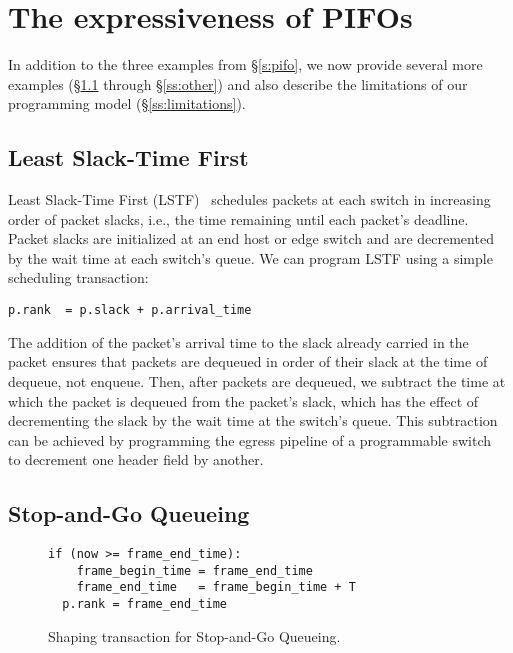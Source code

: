 \section{The expressiveness of PIFOs}
\label{s:expressive}

In addition to the three examples from \S\ref{s:pifo}, we now provide
several more examples (\S\ref{ss:lstf} through \S\ref{ss:other}) and
also describe the limitations of our programming model
(\S\ref{ss:limitations}).

%

\subsection{Least Slack-Time First}
\label{ss:lstf}

Least Slack-Time First (LSTF)~\cite{lstf,ups} schedules packets at
  each switch in increasing order of packet slacks, i.e., the time
  remaining until each packet's deadline.  Packet slacks are
  initialized at an end host or edge switch and are decremented by the
  wait time at each switch's queue. We can program LSTF using a simple 
  scheduling transaction:
\begin{lstlisting}[style=customc]
  p.rank  = p.slack + p.arrival_time
\end{lstlisting}

The addition of the packet's arrival time to the slack already carried
in the packet ensures that packets are dequeued in order of their
slack at the time of dequeue, not enqueue. Then, after packets are
dequeued, we subtract the time at which the packet is dequeued from
the packet's slack, which has the effect of decrementing the slack by
the wait time at the switch's queue. This subtraction can be achieved
by programming the egress pipeline of a programmable switch~\cite{rmt}
to decrement one header field by another.

\subsection{Stop-and-Go Queueing}
\label{ss:stopngo}

\begin{figure}[h]
  \begin{lstlisting}[style=customc]
  if (now >= frame_end_time):
    frame_begin_time = frame_end_time
    frame_end_time   = frame_begin_time + T
  p.rank = frame_end_time
  \end{lstlisting}
\caption{Shaping transaction for Stop-and-Go Queueing.}
\label{fig:stopngo}
\end{figure}

